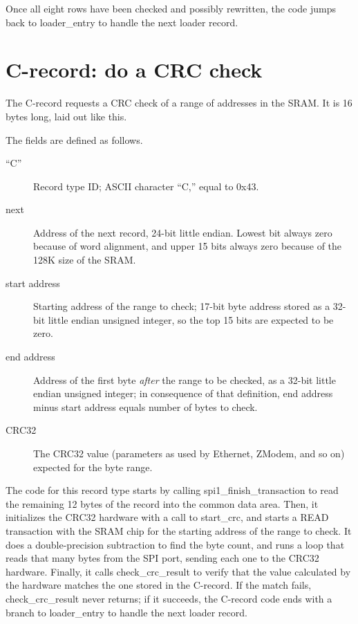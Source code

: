 Once all eight rows have been checked and possibly rewritten, the code jumps
back to loader\_entry to handle the next loader record.

\section{C-record: do a CRC check}

The C-record requests a CRC check of a range of addresses in the SRAM.  It
is 16 bytes long, laid out like this.


The fields are defined as follows.

\begin{description}
  \item[``C''] Record type ID; ASCII character ``C,'' equal to 0x43.
  \item[next] Address of the next record, 24-bit little endian.  Lowest bit
    always zero because of word alignment, and upper 15 bits always zero
    because of the 128K size of the SRAM.
  \item[start address] Starting address of the range to check; 17-bit byte
    address stored as a 32-bit little endian unsigned integer, so the top 15
    bits are expected to be zero.
  \item[end address] Address of the first byte \emph{after} the range to
    be checked, as a 32-bit little endian unsigned integer; in consequence
    of that definition, end address minus start address equals number of
    bytes to check.
  \item[CRC32] The CRC32 value (parameters as used by Ethernet, ZModem, and
    so on) expected for the byte range.
\end{description}

The code for this record type starts by calling spi1\_finish\_transaction to
read the remaining 12 bytes of the record into the common data area.  Then,
it initializes the CRC32 hardware with a call to start\_crc, and starts a
READ transaction with the SRAM chip for the starting address of the range to
check.  It does a double-precision subtraction to find the byte count, and
runs a loop that reads that many bytes from the SPI port, sending each one
to the CRC32 hardware.  Finally, it calls check\_crc\_result to verify that
the value calculated by the hardware matches the one stored in the C-record. 
If the match fails, check\_crc\_result never returns; if it succeeds, the
C-record code ends with a branch to loader\_entry to handle the next loader
record.


